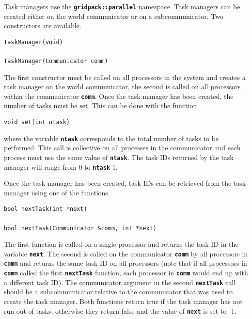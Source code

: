 \documentclass[12pt]{report} %
\begin{document}
Task managers use the \texttt{\textbf{gridpack::parallel}} namespace. Task managers can be created either on the world communicator or on a subcommunicator. Two constructors are available.

{
\color{red}
\begin{Verbatim}[fontseries=b]
TaskManager(void)

TaskManager(Communicator comm)
\end{Verbatim}
}

The first constructor must be called on all processors in the system and creates a task manager on the world communicator, the second is called on all processors within the communicator \texttt{\textbf{comm}}. Once the task manager has been created, the number of tasks must be set. This can be done with the function

{
\color{red}
\begin{Verbatim}[fontseries=b]
void set(int ntask)
\end{Verbatim}
}

where the variable \texttt{\textbf{ntask}} corresponds to the total number of tasks to be performed. This call is collective on all processes in the communicator and each process must use the same value of \texttt{\textbf{ntask}}. The task IDs returned by the task manager will range from 0 to \texttt{\textbf{ntask}}-1.

Once the task manager has been created, task IDs can be retrieved from the task manager using one of the functions

{
\color{red}
\begin{Verbatim}[fontseries=b]
bool nextTask(int *next)

bool nextTask(Communicator &comm, int *next)
\end{Verbatim}
}

The first function is called on a single processor and returns the task ID in the variable \texttt{\textbf{next}}. The second is called on the communicator \texttt{\textbf{comm}} by all processors in \texttt{\textbf{comm}} and returns the same task ID on all processors (note that if all processors in \texttt{\textbf{comm}} called the first \texttt{\textbf{nextTask}} function, each processor in \texttt{\textbf{comm}} would end up with a different task ID). The communicator argument in the second \texttt{\textbf{nextTask}} call should be a subcommunicator relative to the communicator that was used to create the task manager. Both functions return true if the task manager has not run out of tasks, otherwise they return false and the value of \texttt{\textbf{next}} is set to -1.
\end{document}
